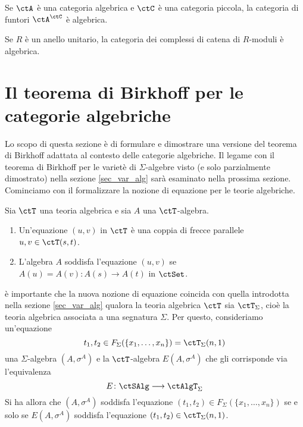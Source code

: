 \begin{proposition}\label{prop_stab_alg_exp}
	Se \(\ctA\) è una categoria algebrica e \(\ctC\) è una categoria piccola, la categoria di funtori \(\ctA^{\ctC}\) è algebrica.
\end{proposition}

\begin{example}\label{esempio_chain}
	Se \(R\) è un anello unitario, la categoria dei complessi di catena di \(R\)-moduli è algebrica.
\end{example}

\section{Il teorema di Birkhoff per le categorie algebriche}\label{sec_th_Birkhoff}

Lo scopo di questa sezione è di formulare e dimostrare una versione del teorema di Birkhoff adattata al contesto delle
categorie algebriche. Il legame con il teorema di Birkhoff per le varietè di \(\Sigma\)-algebre visto (e solo parzialmente dimostrato)
nella sezione \ref{sec_var_alg} sarà esaminato nella prossima sezione. Cominciamo con il formalizzare la nozione di equazione
per le teorie algebriche.

\begin{definition}\label{def_equaz_th_alg}
	Sia \(\ctT\) una teoria algebrica e sia \(A\) una \(\ctT\)-algebra.
	\begin{enumerate}
		\item Un'equazione \((u,v)\) in \(\ctT\) è una coppia di frecce parallele \(u,v \in \ctT(s,t)\).
		\item L'algebra \(A\) soddisfa l'equazione \((u,v)\) se \(A(u)=A(v) \colon A(s) \to A(t)\) in \(\ctSet\).
	\end{enumerate}
\end{definition}

\begin{remark}\label{oss_conf_equaz}
	è importante che la nuova nozione di equazione coincida con quella introdotta nella sezione \ref{sec_var_alg} qualora la teoria algebrica
	\(\ctT\) sia \(\ctT_{\Sigma}\), cioè la teoria algebrica associata a una segnatura \(\Sigma\). Per questo, consideriamo un'equazione
	\[
		t_1,t_2 \in F_{\Sigma}(\{x_1,\ldots,x_n\}) = \ctT_{\Sigma}(n,1)
	\]
	una \(\Sigma\)-algebra \((A, \sigma^A)\) e la \(\ctT\)-algebra \(E(A,\sigma^A)\) che gli corrisponde via l'equivalenza
	\[
		E \colon \ctSAlg \fun \ctAlgT_{\Sigma}
	\]
	Si ha allora che \((A,\sigma^A)\) soddisfa l'equazione \((t_1,t_2) \in F_{\Sigma}(\{x_1,\ldots,x_n\})\) se e solo se \(E(A,\sigma^A)\) soddisfa
	l'equazione \((t_1,t_2) \in \ctT_{\Sigma}(n,1)\).
\end{remark}

